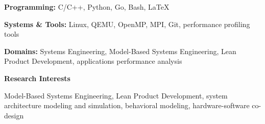 \documentclass[11pt]{article}
\begin{document}
\textbf{Programming:} C/C++, Python, Go, Bash, LaTeX

\textbf{Systems \& Tools:} Linux, QEMU, OpenMP, MPI, Git, performance profiling tools

\textbf{Domains:} Systems Engineering, Model-Based Systems Engineering, Lean Product Development, applications performance analysis

\begin{center}
    \textbf{Research Interests}
\end{center}

Model-Based Systems Engineering, Lean Product Development, system architecture modeling and simulation, behavioral modeling, hardware-software co-design
\end{document}
